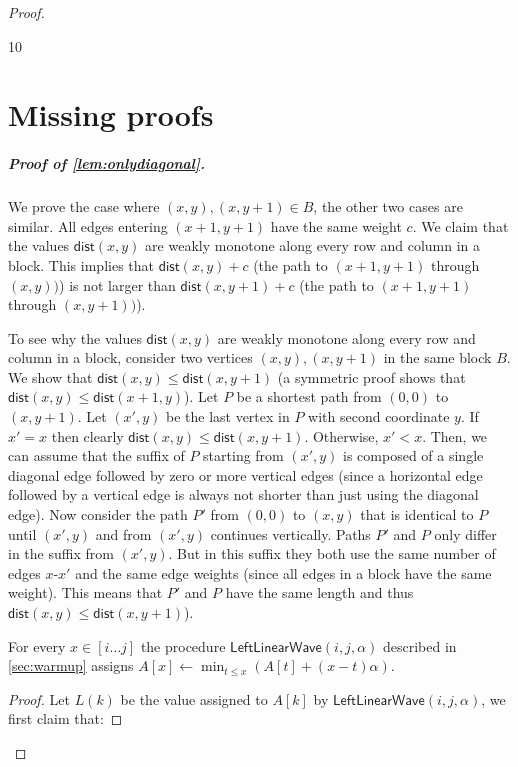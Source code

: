 \documentclass[a4paper,UKenglish,cleveref, autoref, thm-restate]{lipics-v2021}
\newcommand{\LLW}{\mathsf{LeftLinearWave}}
\newcommand{\assign}{\leftarrow}
\newcommand{\dist}{\mathsf{dist}}
\newcommand{\para}[1]{\vspace{-0.1in} \subparagraph*{#1}}
\begin{document}
\begin{proof}
\begin{thebibliography}{10}
\end{thebibliography}

\appendix
\section{Missing proofs}\label{sec:appendix}

\para{Proof of 
\cref{lem:onlydiagonal}.}
We prove the case where $(x,y),(x,y+1) \in B$, the other two cases are similar.  
All edges entering $(x+1,y+1)$ have the same weight $c$. 
We claim that the values $\dist(x,y)$ are weakly monotone along every row and column in a block.
This implies that $\dist(x,y)+c$ (the path to $(x+1,y+1)$ through $(x,y))$) is not larger than $\dist(x,y+1)+c$ (the path to $(x+1,y+1)$ through $(x,y+1))$).  

To see why the values $\dist(x,y)$ are weakly monotone along every row and column in a block, consider two vertices $(x,y),(x,y+1)$ in the same block $B$. We show that $\dist(x,y) \le  \dist(x,y+1)$ (a  symmetric proof shows that $\dist(x,y) \le  \dist(x+1,y)$).
Let $P$ be a shortest path from $(0,0)$ to $(x,y+1)$. 
Let $(x',y)$ be the last vertex in $P$ with second coordinate $y$. 
If $x'=x$ then clearly $\dist(x,y) \le \dist(x,y+1)$. Otherwise, $x' < x$. 
Then, we can assume that the suffix of $P$ starting from $(x',y)$ is composed of a single diagonal edge followed by zero or more vertical edges (since a horizontal edge followed by a vertical edge is always not shorter than just using the diagonal edge). 
Now consider the path $P'$ from $(0,0)$ to $(x,y)$ that is identical to $P$ until $(x',y)$ and from $(x',y)$ continues vertically. Paths $P'$ and $P$ only differ in the suffix from $(x',y)$. But in this suffix they both use the same number of edges $x$-$x'$ and the same edge weights (since all edges in a block have the same weight). 
This means that $P'$ and $P$ have the same length and thus $\dist(x,y) \le \dist(x,y+1)$).      

\begin{lemma}\label{lem:ray}
For every $x\in [i\ldots j]$ the procedure $\LLW(i,j,\alpha)$ described in \cref{sec:warmup} assigns  $A[x]\assign \min_{t\le x}(A[t] + (x-t)\alpha)$.
\end{lemma}
\begin{proof}
Let $L(k)$ be the value assigned to $A[k]$ by $\LLW(i,j,\alpha)$, we first claim that: 


\end{proof}
\end{proof}
\end{document}
